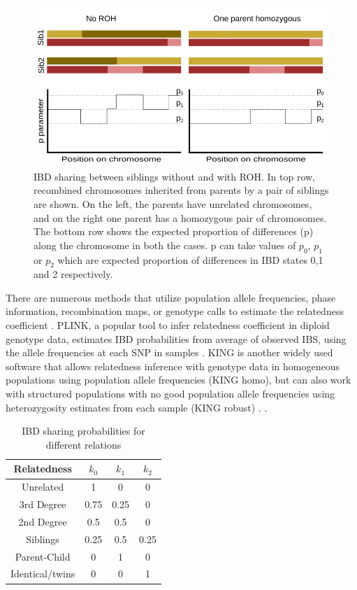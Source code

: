 \documentclass[12pt, letterpaper]{article}
\begin{document}
\begin{figure}[h!]
    \includegraphics[width=18cm]{plots/inkscape_finalImg/schematic_sib.png}
    \centering
    \caption{IBD sharing between siblings without and with ROH. In top row, recombined chromosomes inherited from parents by a pair of siblings are shown. On the left, the parents have unrelated chromosomes, and on the right one parent has a homozygous pair of chromosomes. The bottom row shows the expected proportion of differences (p) along the chromosome in both the cases. p can take values of $p_0$, $p_1$ or $p_2$ which are expected proportion of differences in IBD states 0,1 and 2 respectively.  }
    \label{fig0:schematic}
\end{figure}


There are numerous methods that utilize population allele frequencies, phase information, recombination maps, or genotype calls to estimate the relatedness coefficient \cite{huff_maximum-likelihood_2011,li_relationship_2014,li_accurate_2014,thornton_estimating_2012}. PLINK, a popular tool to infer relatedness coefficient in diploid genotype data, estimates IBD probabilities from average of observed IBS, using the allele frequencies at each SNP in samples \cite{purcell_plink_2007}. KING is another widely used software that allows relatedness inference with genotype data in homogeneous populations using population allele frequencies (KING homo), but can also work with structured populations with no good population allele frequencies using heterozygosity estimates from each sample (KING robust) \cite{manichaikul_robust_2010}. . 

\begin{table}
\caption{\label{tab:Table 1}IBD sharing probabilities for different relations}
\begin{tabular}{|c|c|c|c|}
    \hline
    Relatedness & $k_0$ & $k_1$ & $k_2$\\
    \hline
    Unrelated & 1 & 0 & 0\\
    \hline
    3rd Degree & 0.75 & 0.25 & 0\\
    \hline
    2nd Degree & 0.5 & 0.5 & 0\\
    \hline
    Siblings & 0.25 & 0.5 & 0.25\\
    \hline
    Parent-Child & 0 & 1 & 0\\
    \hline
    Identical/twins & 0 & 0 & 1\\
    \hline
\end{tabular}
\label{table1}
\end{table}
\end{document}
